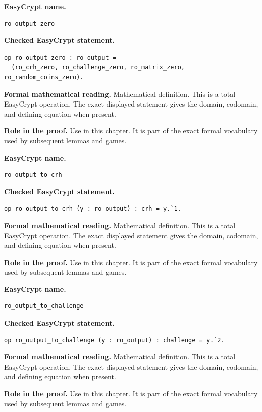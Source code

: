 \begin{formaldefinition}
\noindent\textbf{EasyCrypt name.}
\begin{lstlisting}[language=EasyCrypt,basicstyle=\ttfamily\scriptsize]
ro_output_zero
\end{lstlisting}
\noindent\textbf{Checked EasyCrypt statement.}
\begin{lstlisting}[language=EasyCrypt,basicstyle=\ttfamily\scriptsize]
op ro_output_zero : ro_output =
  (ro_crh_zero, ro_challenge_zero, ro_matrix_zero, ro_random_coins_zero).
\end{lstlisting}
\noindent\textbf{Formal mathematical reading.}
Mathematical definition. This is a total EasyCrypt operation.  The exact displayed statement gives the domain, codomain, and defining equation when present.

\noindent\textbf{Role in the proof.}
Use in this chapter. It is part of the exact formal vocabulary used by subsequent lemmas and games.

\end{formaldefinition}

\begin{formaldefinition}
\noindent\textbf{EasyCrypt name.}
\begin{lstlisting}[language=EasyCrypt,basicstyle=\ttfamily\scriptsize]
ro_output_to_crh
\end{lstlisting}
\noindent\textbf{Checked EasyCrypt statement.}
\begin{lstlisting}[language=EasyCrypt,basicstyle=\ttfamily\scriptsize]
op ro_output_to_crh (y : ro_output) : crh = y.`1.
\end{lstlisting}
\noindent\textbf{Formal mathematical reading.}
Mathematical definition. This is a total EasyCrypt operation.  The exact displayed statement gives the domain, codomain, and defining equation when present.

\noindent\textbf{Role in the proof.}
Use in this chapter. It is part of the exact formal vocabulary used by subsequent lemmas and games.

\end{formaldefinition}

\begin{formaldefinition}
\noindent\textbf{EasyCrypt name.}
\begin{lstlisting}[language=EasyCrypt,basicstyle=\ttfamily\scriptsize]
ro_output_to_challenge
\end{lstlisting}
\noindent\textbf{Checked EasyCrypt statement.}
\begin{lstlisting}[language=EasyCrypt,basicstyle=\ttfamily\scriptsize]
op ro_output_to_challenge (y : ro_output) : challenge = y.`2.
\end{lstlisting}
\noindent\textbf{Formal mathematical reading.}
Mathematical definition. This is a total EasyCrypt operation.  The exact displayed statement gives the domain, codomain, and defining equation when present.

\noindent\textbf{Role in the proof.}
Use in this chapter. It is part of the exact formal vocabulary used by subsequent lemmas and games.

\end{formaldefinition}

